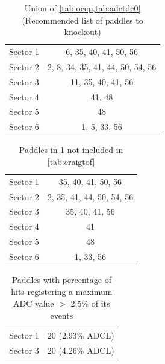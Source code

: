 \begin{table}
\centering
\begin{tabular}{l | c |}
Sector 1 & 6, 35, 40, 41, 50, 56\\
Sector 2 & 2, 8, 34, 35, 41, 44, 50, 54, 56\\
Sector 3 & 11, 35, 40, 41, 56\\
Sector 4 & 41, 48 \\
Sector 5 & 48\\
Sector 6 & 1, 5, 33, 56
\end{tabular}
\caption{Union of \ref{tab:occp,tab:adctdc0} (Recommended list of paddles to knockout)}
\label{tab:tofko}
\end{table}

\begin{table}
\centering
\begin{tabular}{l | c |}
Sector 1 & 35, 40, 41, 50, 56 \\
Sector 2 & 2, 35, 41, 44, 50, 54, 56 \\
Sector 3 & 35, 40, 41, 56 \\
Sector 4 & 41 \\
Sector 5 & 48 \\
Sector 6 & 1, 33, 56
\end{tabular}
\caption{Paddles in \ref{tab:tofko} not included in \ref{tab:craigtof}}
\label{tab:diff}
\end{table}

\begin{table}
\centering
\begin{tabular}{l | c |}
Sector 1 & 20 (2.93\% ADCL)\\
Sector 3 & 20 (4.26\% ADCL)
\end{tabular}
\caption{Paddles with percentage of hits registering a maximum ADC value \( > \) 2.5\% of its events}
\label{tab:adcM}
\end{table}

